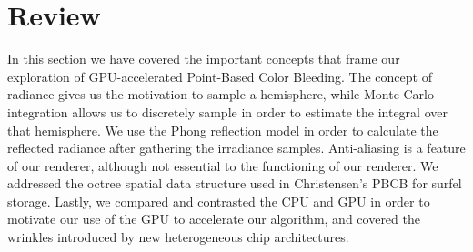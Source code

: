 \section{Review}

In this section we have covered the important concepts that frame our exploration of GPU-accelerated Point-Based Color Bleeding. The concept of radiance gives us the motivation to sample a hemisphere, while Monte Carlo integration allows us to discretely sample in order to estimate the integral over that hemisphere. We use the Phong reflection model in order to calculate the reflected radiance after gathering the irradiance samples. Anti-aliasing is a feature of our renderer, although not essential to the functioning of our renderer. We addressed the octree spatial data structure used in Christensen's PBCB \cite{bib:christensen2008} for surfel storage. Lastly, we compared and contrasted the CPU and GPU in order to motivate our use of the GPU to accelerate our algorithm, and covered the wrinkles introduced by new heterogeneous chip architectures.

